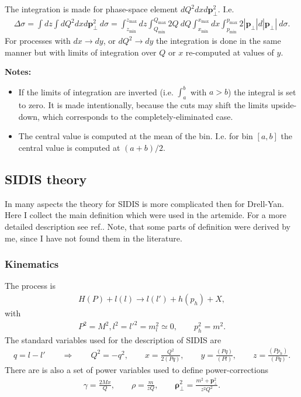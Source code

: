 \documentclass[prd,nofootinbib,eqsecnum,final]{revtex4}
\renewcommand{\(}{\left(}
\renewcommand{\)}{\right)}
\renewcommand{\[}{\left[}
\renewcommand{\]}{\right]}
\renewcommand{\vec}[1]{\bm{#1}}
\begin{document}
The integration is made for phase-space element $dQ^2 dx d\vec p_\perp^2$. I.e.
\begin{eqnarray}
\Delta \sigma =\int dz \int dQ^2 dx d\vec p_\perp^2~ d\sigma
=\int_{z_{\min}}^{z_{\max}} dz\int_{Q_{\min}}^{Q_{\max}} 2Q~ dQ \int_{x_{\min}}^{x_{\max}} dx \int_{p_{\min}}^{p_{\max}} 2|\vec p_\perp|d|\vec p_\perp|~ d\sigma.
\end{eqnarray}
For processes with $dx\to dy$, or $dQ^2\to dy$ the integration is done in the same manner but with limits of integration over $Q$ or $x$ re-computed at values of $y$.

\textbf{Notes:} 
\begin{itemize}
\item If the limits of integration are inverted (i.e. $\int_a^b$ with $a>b$) the integral is set to zero. It is made intentionally, because the cuts may shift the limits upside-down, which corresponds to the completely-eliminated case.
\item The central value is computed at the mean of the bin. I.e. for bin $[a,b]$ the central value is computed at $(a+b)/2$.
\end{itemize}




\subsection{SIDIS theory}
\label{sec:SIDIS:theory}

In many aspects the theory for SIDIS is more complicated then for Drell-Yan. Here I collect the main definition which were used in the artemide. For a more detailed description see ref.\cite{Bacchetta:2006tn}. Note, that some parts of definition were derived by me, since I have not found them in the literature.

\subsubsection{Kinematics}

The process is
\begin{eqnarray}
H(P)+l(l)\to l(l')+h(p_h)+X,
\end{eqnarray}
with
\begin{eqnarray}
P^2=M^2, l^2=l'^2=m_l^2\simeq 0,\qquad p_h^2=m^2.
\end{eqnarray}
The standard variables used for the description of SIDIS are
\begin{eqnarray}
q=l-l' \qquad \Rightarrow \qquad Q^2=-q^2,\qquad x=\frac{Q^2}{2(Pq)},\qquad y=\frac{(Pq)}{(Pl)},\qquad z=\frac{(Pp_h)}{(Pq)}.
\end{eqnarray}
There are is also a set of power variables used to define power-corrections
\begin{eqnarray}
\gamma=\frac{2Mx}{Q},\qquad \rho=\frac{m}{zQ},\qquad \vec \rho_\perp^2=\frac{m^2+\vec p_\perp^2}{z^2Q^2}.
\end{eqnarray}
\end{document}

